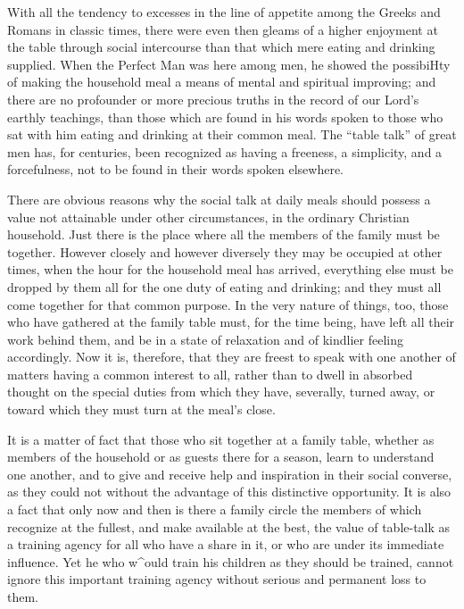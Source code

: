 \documentclass[
]{book}
\begin{document}
With all the tendency to excesses in the line of appetite among the Greeks and Romans in classic times, there were even then gleams of a higher enjoyment at the table through social intercourse than that which mere eating and drinking supplied. When the Perfect Man was here among men, he showed the possibiHty of making the household meal a means of mental and spiritual improving; and there are no profounder or more precious truths in the record of our Lord's earthly teachings, than those which are found in his words spoken to those who sat with him eating and drinking at their common meal. The ``table talk'' of great men has, for centuries, been recognized as having a freeness, a simplicity, and a forcefulness, not to be found in their words spoken elsewhere.

There are obvious reasons why the social talk at daily meals should possess a value not attainable under other circumstances, in the ordinary Christian household. Just there is the place where all the members of the family must be together. However closely and however diversely they may be occupied at other times, when the hour for the household meal has arrived, everything else must be dropped by them all for the one duty of eating and drinking; and they must all come together for that common purpose. In the very nature of things, too, those who have gathered at the family table must, for the time being, have left all their work behind them, and be in a state of relaxation and of kindlier feeling accordingly. Now it is, therefore, that they are freest to speak with one another of matters having a common interest to all, rather than to dwell in absorbed thought on the special duties from which they have, severally, turned away, or toward which they must turn at the meal's close.

It is a matter of fact that those who sit together at a family table, whether as members of the household or as guests there for a season, learn to understand one another, and to give and receive help and inspiration in their social converse, as they could not without the advantage of this distinctive opportunity. It is also a fact that only now and then is there a family circle the members of which recognize at the fullest, and make available at the best, the value of table-talk as a training agency for all who have a share in it, or who are under its immediate influence. Yet he who w\^{}ould train his children as they should be trained, cannot ignore this important training agency without serious and permanent loss to them.
\end{document}

